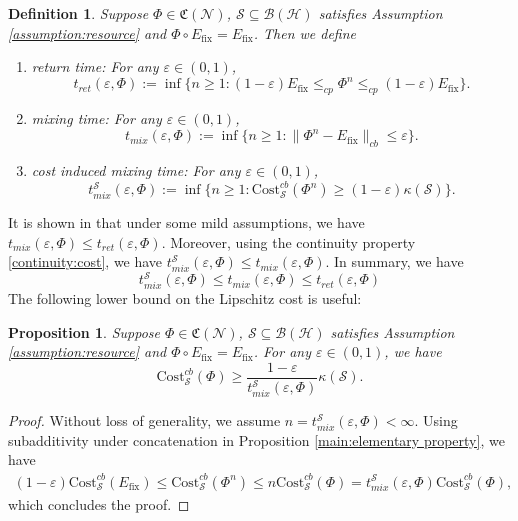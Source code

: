 \documentclass[11pt,reqno]{amsart}
\numberwithin{equation}{section}
\newtheorem{prop}[lemma]{Proposition}
\newtheorem{definition}[lemma]{Definition}
\newcommand{\mc}{\mathcal}
\newcommand{\Cost}{\mathrm{Cost}}
\newcommand{\fix}{\mathrm{fix}}
\newcommand{\CScb}{\Cost_{\mc S}^{cb}}
\begin{document}
\begin{definition}
Suppose $\Phi \in \mathfrak{C}(\mc N)$, $\mc S \subseteq \mc B(\mc H)$ satisfies Assumption \ref{assumption:resource} and $\Phi \circ E_{\fix} = E_{\fix}$. Then we define 
\begin{enumerate}
        \item \textit{return time}: For any $\varepsilon \in (0,1)$,
        \begin{equation}
            t_{ret}(\varepsilon,\Phi):= \inf\{n\ge 1: (1-\varepsilon) E_{\fix} \le_{cp} \Phi^n \le_{cp} (1-\varepsilon) E_{\fix}\}.
        \end{equation}
        \item \textit{mixing time}: For any $\varepsilon \in (0,1)$,
        \begin{equation}\label{def:mixing time}
            t_{mix}(\varepsilon,\Phi):= \inf\{n\ge 1: \|\Phi^{n} - E_{\fix}\|_{cb} \le \varepsilon\}.
        \end{equation}
        \item \textit{cost induced mixing time}: For any $\varepsilon \in (0,1)$,
        \begin{equation}\label{def:cost mixing time}
            t_{mix}^{\mc S}(\varepsilon,\Phi):= \inf\{n\ge 1: \CScb(\Phi^n) \ge (1-\varepsilon) \kappa(\mc S)\}.
        \end{equation}
\end{enumerate}
\end{definition}
It is shown in \cite{GJLL22} that under some mild assumptions, we have $t_{mix}(\varepsilon,\Phi) \le t_{ret}(\varepsilon,\Phi)$. Moreover, using the continuity property \eqref{continuity:cost}, we have $t_{mix}^{\mc S}(\varepsilon,\Phi) \le t_{mix}(\varepsilon,\Phi)$. In summary, we have 
\begin{equation}
    t_{mix}^{\mc S}(\varepsilon,\Phi)  \le t_{mix}(\varepsilon,\Phi) \le t_{ret}(\varepsilon,\Phi)
\end{equation}
The following lower bound on the Lipschitz cost is useful: 
\begin{prop}\label{prop:lower bound cost}
Suppose $\Phi \in \mathfrak{C}(\mc N)$, $\mc S \subseteq \mc B(\mc H)$ satisfies Assumption \ref{assumption:resource} and $\Phi \circ E_{\fix} = E_{\fix}$. For any $\varepsilon\in (0,1)$, we have 
\begin{equation}
\CScb(\Phi) \ge \frac{1-\varepsilon}{t_{mix}^{\mc S}(\varepsilon,\Phi)} \kappa(\mc S). 
\end{equation}
\end{prop}
\begin{proof}
Without loss of generality, we assume $n=t^{\mc S}_{mix}(\varepsilon, \Phi)<\infty$. Using subadditivity under concatenation in Proposition \ref{main:elementary property}, we have 
\begin{align*}
    (1-\varepsilon)\CScb(E_{\fix}) \le \CScb(\Phi^n) \le n \CScb(\Phi) = t^{\mc S}_{mix}(\varepsilon, \Phi) \CScb(\Phi),
\end{align*}
which concludes the proof.
\end{proof}	
\end{document}
